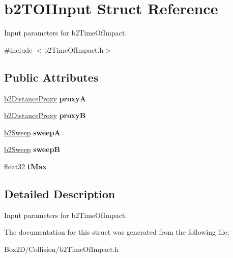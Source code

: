 \hypertarget{structb2_t_o_i_input}{}\section{b2\+T\+O\+I\+Input Struct Reference}
\label{structb2_t_o_i_input}


Input parameters for b2\+Time\+Of\+Impact.  




{\ttfamily \#include $<$b2\+Time\+Of\+Impact.\+h$>$}

\subsection*{Public Attributes}
\begin{DoxyCompactItemize}
\item 
\mbox{\label{structb2_t_o_i_input_a5c5fb931435d92ac2d2080552400cd57}} 
\hyperlink{structb2_distance_proxy}{b2\+Distance\+Proxy} {\bfseries proxyA}
\item 
\mbox{\label{structb2_t_o_i_input_a7f4e614d1c574006402e9610c984a93f}} 
\hyperlink{structb2_distance_proxy}{b2\+Distance\+Proxy} {\bfseries proxyB}
\item 
\mbox{\label{structb2_t_o_i_input_adf63a4b9969aa839c2d520bf6d76148a}} 
\hyperlink{structb2_sweep}{b2\+Sweep} {\bfseries sweepA}
\item 
\mbox{\label{structb2_t_o_i_input_af506b6adc7eca852f08460ec76c7b9a7}} 
\hyperlink{structb2_sweep}{b2\+Sweep} {\bfseries sweepB}
\item 
\mbox{\label{structb2_t_o_i_input_a365a434996de60957777a673918d3a5f}} 
float32 {\bfseries t\+Max}
\end{DoxyCompactItemize}


\subsection{Detailed Description}
Input parameters for b2\+Time\+Of\+Impact. 

The documentation for this struct was generated from the following file\+:\begin{DoxyCompactItemize}
\item 
Box2\+D/\+Collision/b2\+Time\+Of\+Impact.\+h\end{DoxyCompactItemize}
